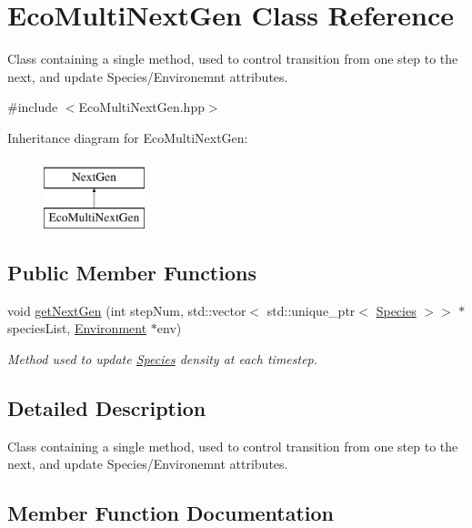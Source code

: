 \hypertarget{classEcoMultiNextGen}{}\section{Eco\+Multi\+Next\+Gen Class Reference}
\label{classEcoMultiNextGen}


Class containing a single method, used to control transition from one step to the next, and update Species/\+Environemnt attributes.  




{\ttfamily \#include $<$Eco\+Multi\+Next\+Gen.\+hpp$>$}

Inheritance diagram for Eco\+Multi\+Next\+Gen\+:\begin{figure}[H]
\begin{center}
\leavevmode
\includegraphics[height=2.000000cm]{classEcoMultiNextGen}
\end{center}
\end{figure}
\subsection*{Public Member Functions}
\begin{DoxyCompactItemize}
\item 
void \hyperlink{classEcoMultiNextGen_a956065141696cac390d8acb8ca5bcccb}{get\+Next\+Gen} (int step\+Num, std\+::vector$<$ std\+::unique\+\_\+ptr$<$ \hyperlink{classSpecies}{Species} $>$$>$ $\ast$species\+List, \hyperlink{classEnvironment}{Environment} $\ast$env)
\begin{DoxyCompactList}\small\item\em Method used to update \hyperlink{classSpecies}{Species} density at each timestep. \end{DoxyCompactList}\end{DoxyCompactItemize}


\subsection{Detailed Description}
Class containing a single method, used to control transition from one step to the next, and update Species/\+Environemnt attributes. 

\subsection{Member Function Documentation}
\mbox{\label{classEcoMultiNextGen_a956065141696cac390d8acb8ca5bcccb}} 
